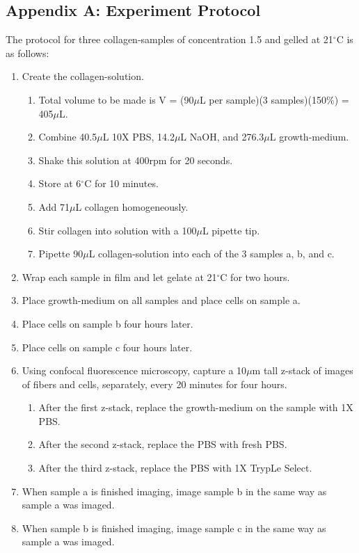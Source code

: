 \documentclass[ twocolumn,notitlepage]{ revtex4-1}
\begin{document}
\subsection*{Appendix A: Experiment Protocol}
The protocol for three collagen-samples of concentration 1.5 and gelled at 21$^{\circ}$C is as follows:
\begin{enumerate}
	\item Create the collagen-solution.
	\begin{enumerate}
		\item Total volume to be made is V = (90$\mu$L per sample)(3 samples)(150\%) = 405$\mu$L.
		\item Combine 40.5$\mu$L 10X PBS, 14.2$\mu$L NaOH, and 276.3$\mu$L growth-medium.
		\item Shake this solution at 400rpm for 20 seconds.
		\item Store at 6$^{\circ}$C for 10 minutes.
		\item Add 71$\mu$L collagen homogeneously.
		\item Stir collagen into solution with a 100$\mu$L pipette tip.
		\item Pipette 90$\mu$L collagen-solution into each of the 3 samples a, b, and c.
		\end{enumerate}
	\item Wrap each sample in film and let gelate at 21$^{\circ}$C for two hours.
	\item Place growth-medium on all samples and place cells on sample a.
	\item Place cells on sample b four hours later.
	\item Place cells on sample c four hours later.
	\item Using confocal fluorescence microscopy, capture a 10$\mu$m tall z-stack of images of fibers and cells, separately, every 20 minutes for four hours.
	\begin{enumerate}
		\item After the first z-stack, replace the growth-medium on the sample with 1X PBS.
		\item After the second z-stack, replace the PBS with fresh PBS.
		\item After the third z-stack, replace the PBS with 1X TrypLe\texttrademark\hspace{.1em} Select.
	\end{enumerate}
		\item When sample a is finished imaging, image sample b in the same way as sample a was imaged.
		\item When sample b is finished imaging, image sample c in the same way as sample a was imaged.
\end{enumerate}
\end{document}

